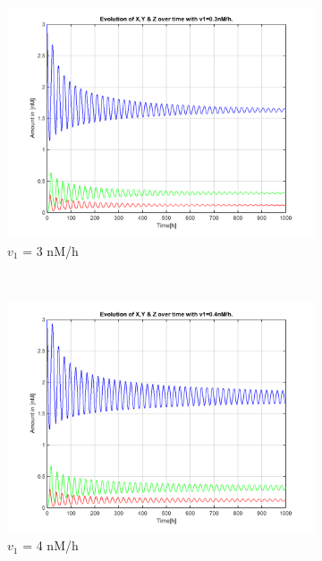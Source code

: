 \documentclass[10pt,a4paper,oneside,twocolumn]{article}
\numberwithin{equation}{section} %
\begin{document}
\begin{figure}
	\begin{subfigure}[b]{0.32\textwidth}
	    \includegraphics[width=\textwidth]{LotsofthesameA/A-A3.png}
	    \caption{$v_1$ = 3 nM/h}
	\end{subfigure}
	~ 
	\begin{subfigure}[b]{0.32\textwidth}
	    \includegraphics[width=\textwidth]{LotsofthesameA/A-A4.png}
	    \caption{$v_1$ = 4 nM/h}
	\end{subfigure}
	~
	\begin{subfigure}[b]{0.32\textwidth}

\end{subfigure}
\end{figure}
\end{document}
